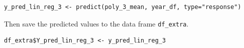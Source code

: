 \documentclass[a4paper]{article}
\begin{document}
\begin{mdframed}[leftline=false,rightline=false,backgroundcolor=lightblue!10,nobreak=false]
    \begin{verbatim}
y_pred_lin_reg_3 <- predict(poly_3_mean, year_df, type="response")
    \end{verbatim}
\end{mdframed}
Then save the predicted values to the data frame \verb|df_extra|.
\begin{mdframed}[leftline=false,rightline=false,backgroundcolor=lightblue!10,nobreak=false]
    \begin{verbatim}
df_extra$Y_pred_lin_reg_3 <- y_pred_lin_reg_3
    \end{verbatim}
\end{mdframed}
\end{document}
